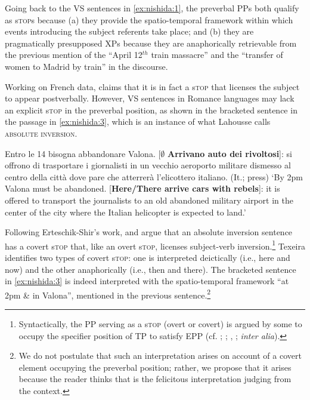 \documentclass[output=paper,colorlinks,citecolor=brown,
]{langscibook}
\begin{document}
Going back to the VS sentences in \ref{ex:nishida:1}, the preverbal PPs both qualify as s\textsc{top}s because (a) they provide the spatio-temporal framework within which events introducing the subject referents take place; and (b) they are pragmatically presupposed XPs because they are anaphorically retrievable from the previous mention of the ``April 12$^{th}$ train massacre'' and the ``transfer of women to Madrid by train'' in the discourse. 

Working on French data, \citet{lahousse2007implicit} claims that it is in fact a s\textsc{top} that licenses the subject to appear postverbally. However, VS sentences in Romance languages may lack an explicit s\textsc{top} in the preverbal position, as shown in the bracketed sentence in the passage in \ref{ex:nishida:3}, which is an instance of what Lahousse calls \textsc{absolute inversion}.

\begin{exe} %
    \ex\label{ex:nishida:3} 
   Entro le 14 bisogna abbandonare Valona. [$\emptyset$ \textbf{Arrivano auto dei rivoltosi}]: 
   si offrono di 	trasportare i giornalisti in un vecchio aeroporto militare dismesso al centro della città dove pare che atterrerà l’elicottero italiano. (It.; press)
   \glt ‘By 2pm Valona must be abandoned. [\textbf{Here/There arrive cars with rebels}]: it is offered to 	transport the journalists to an old abandoned military airport in the center of the city where 	the Italian helicopter is expected to land.’ 
\end{exe}

Following Erteschik-Shir's work, \citet{lahousse2007implicit} and \citet{teixeira2016locative} argue that an absolute inversion sentence has a covert s\textsc{top} that, like an overt s\textsc{top}, licenses subject-verb inversion.\footnote{Syntactically, the PP serving as a s\textsc{top} (overt or covert) is argued by some to occupy the specifier position of TP to satisfy EPP (cf. 
\citealt{pinto1997}; \citealt{ortega2005locative}; \citealt{Sheehan2006}, \citeyear{Sheehan2010}; \textit{inter alia}).}
Texeira identifies two types of covert s\textsc{top}: one is interpreted deictically (i.e., here and now) and the other anaphorically (i.e., then and there). The bracketed sentence in \ref{ex:nishida:3} is indeed interpreted with the spatio-temporal framework ``at 2pm \& in Valona'', mentioned in the previous sentence.\footnote{We do not postulate that such an interpretation arises on account of a covert element occupying the preverbal position; rather, we propose that it arises because the reader thinks that is the felicitous interpretation judging from the context.}
\end{document}
